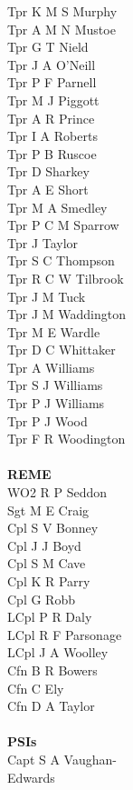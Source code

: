 \documentclass[a4paper,7pt]{book}
\begin{document}
\begin{multicols}{4}
  Tpr K M S Murphy \\
  Tpr A M N Mustoe \\
  Tpr G T Nield \\
  Tpr J A O'Neill \\
  Tpr P F Parnell \\
  Tpr M J Piggott \\
  Tpr A R Prince \\
  Tpr I A Roberts \\
  Tpr P B Ruscoe \\
  Tpr D Sharkey \\
  Tpr A E Short \\
  Tpr M A Smedley \\
  Tpr P C M Sparrow \\
  Tpr J Taylor \\
  Tpr S C Thompson \\
  Tpr R C W Tilbrook \\
  Tpr J M Tuck \\
  Tpr J M Waddington \\
  Tpr M E Wardle \\
  Tpr D C Whittaker \\
  Tpr A Williams \\
  Tpr S J Williams \\
  Tpr P J Williams \\
  Tpr P J Wood \\
  Tpr F R Woodington \\ \\
  \textbf{REME} \\
  WO2 R P Seddon \\
  Sgt M E Craig \\
  Cpl S V Bonney \\
  Cpl J J Boyd \\
  Cpl S M Cave \\
  Cpl K R Parry \\
  Cpl G Robb \\
  LCpl P R Daly \\
  LCpl R F Parsonage \\
  LCpl J A Woolley \\
  Cfn B R Bowers \\
  Cfn C Ely \\
  Cfn D A Taylor \\ \\
  \textbf{PSIs} \\
  Capt S A Vaughan- \\ \indent Edwards \\

\end{multicols}
\end{document}
